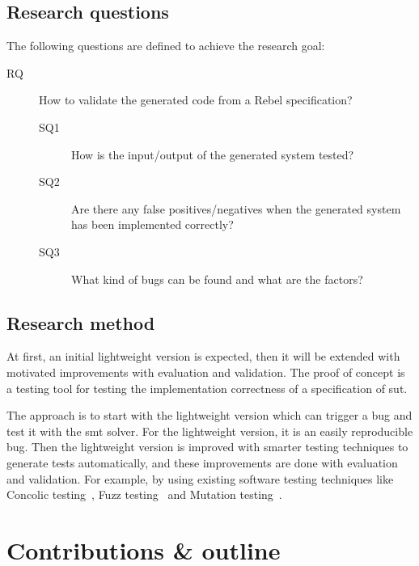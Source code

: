 \subsection{Research questions}\label{sec:research-questions}
The following questions are defined to achieve the research goal:

\begin{description}
  \item [RQ] How to validate the generated code from a Rebel specification?

  \begin{description}
    \item [SQ1] How is the input/output of the generated system tested?
    \item [SQ2] Are there any false positives/negatives when the generated
    system has been implemented correctly?
    \item [SQ3] What kind of bugs can be found and what are the factors?
  \end{description}

\end{description}

\subsection{Research method}\label{sec:research-method}
At first, an initial lightweight version is expected, then it will be extended with motivated
improvements with evaluation and validation. The proof of concept is a testing
tool for testing the implementation correctness of a specification of \gls{sut}.

The
approach is to start with the lightweight version which can trigger a bug and
test it with the \gls{smt} solver. For the lightweight version, it is an easily
reproducible bug. Then the lightweight version is improved with smarter
testing techniques to generate tests automatically, and these improvements are done
with evaluation and validation. For example, by using existing software testing
techniques like Concolic testing~\cite{sen2007concolic},
Fuzz testing~\cite{godefroid2008automated} and Mutation testing~\cite{jia2011analysis}.

\section{Contributions \& outline}
%

